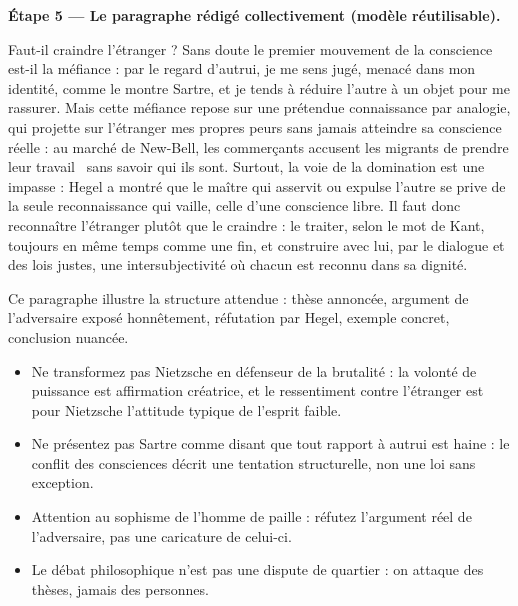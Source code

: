 \documentclass[11pt]{article}
\newcounter{popsec}
\newcounter{popsub}
\newcommand{\courssub}[1]{%
  \stepcounter{popsub}%
  \par\vspace{9pt}\noindent{\popxbold\fontsize{11.5}{13}\selectfont\color{popink}{\color{poporange}\thepopsec.\thepopsub}\hspace{6pt}#1}\par\nopagebreak\vspace{4pt}
}
\begin{document}
\begin{exoresolu}
\textbf{Étape 5 — Le paragraphe rédigé collectivement (modèle réutilisable).}\par
\guillemotleft Faut-il craindre l'étranger ? Sans doute le premier mouvement de la conscience est-il la méfiance : par le regard d'autrui, je me sens jugé, menacé dans mon identité, comme le montre Sartre, et je tends à réduire l'autre à un objet pour me rassurer. Mais cette méfiance repose sur une prétendue connaissance par analogie, qui projette sur l'étranger mes propres peurs sans jamais atteindre sa conscience réelle : au marché de New-Bell, les commerçants accusent les migrants de \guillemotleft prendre leur travail \guillemotright\ sans savoir qui ils sont. Surtout, la voie de la domination est une impasse : Hegel a montré que le maître qui asservit ou expulse l'autre se prive de la seule reconnaissance qui vaille, celle d'une conscience libre. Il faut donc reconnaître l'étranger plutôt que le craindre : le traiter, selon le mot de Kant, toujours en même temps comme une fin, et construire avec lui, par le dialogue et des lois justes, une intersubjectivité où chacun est reconnu dans sa dignité. \guillemotright\par
Ce paragraphe illustre la structure attendue : thèse annoncée, argument de l'adversaire exposé honnêtement, réfutation par Hegel, exemple concret, conclusion nuancée.
\end{exoresolu}

\begin{attention}
\begin{itemize}
\item Ne transformez pas Nietzsche en défenseur de la brutalité : la volonté de puissance est affirmation créatrice, et le ressentiment contre l'étranger est pour Nietzsche l'attitude typique de l'esprit faible.
\item Ne présentez pas Sartre comme disant que tout rapport à autrui est haine : le conflit des consciences décrit une tentation structurelle, non une loi sans exception.
\item Attention au sophisme de l'homme de paille : réfutez l'argument réel de l'adversaire, pas une caricature de celui-ci.
\item Le débat philosophique n'est pas une dispute de quartier : on attaque des thèses, jamais des personnes.
\end{itemize}
\end{attention}

\courssub{Bilan de la leçon}
\end{document}
